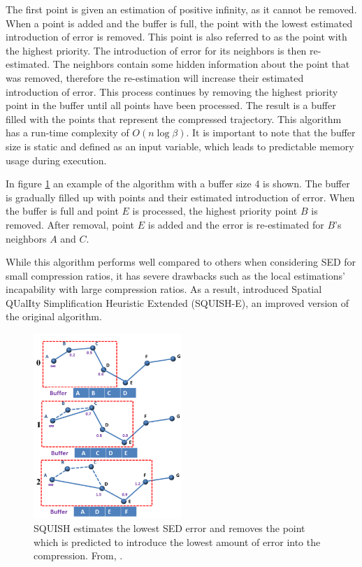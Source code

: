 The first point is given an estimation of positive infinity, as it cannot be removed. When a point is added and the buffer is full, the point with the lowest estimated introduction of error is removed. This point is also referred to as the point with the highest priority. The introduction of error for its neighbors is then re-estimated. The neighbors contain some hidden information about the point that was removed, therefore the re-estimation will increase their estimated introduction of error. This process continues by removing the highest priority point in the buffer until all points have been processed. The result is a buffer filled with the points that represent the compressed trajectory. This algorithm has a run-time complexity of $O(n\log{\beta})$. It is important to note that the buffer size is static and defined as an input variable, which leads to predictable memory usage during execution.

In figure \ref{fig:squish} an example of the algorithm with a buffer size 4 is shown. The buffer is gradually filled up with points and their estimated introduction of error. When the buffer is full and point $E$ is processed, the highest priority point $B$ is removed. After removal, point $E$ is added and the error is re-estimated for $B$'s neighbors $A$ and $C$.

While this algorithm performs well compared to others when considering SED for small compression ratios, it has severe drawbacks such as the local estimations' incapability with large compression ratios. As a result, \textcite{muckell2014compression} introduced Spatial QUalIty Simplification Heuristic Extended (SQUISH-E), an improved version of the original algorithm.

\begin{figure}
    \includegraphics[width=0.5\textwidth]{./figures/squish.png}
    \caption{SQUISH estimates the lowest SED error
        and removes the point which is predicted to introduce
        the lowest amount of error into the compression. From, \textcite{muckell2011squish}.}
    \label{fig:squish}
\end{figure}

